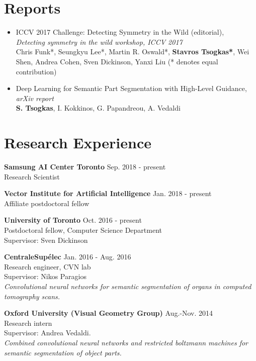 \documentclass[margin]{res}
\begin{document}
\begin{resume}
\section{Reports}
	\begin{itemize}
		\item ICCV 2017 Challenge: Detecting Symmetry in the Wild (editorial), \\
		\emph{Detecting symmetry in the wild workshop, ICCV 2017}\\
		Chris Funk*, Seungkyu Lee*, Martin R. Oswald*, \textbf{Stavros Tsogkas*}, 
		Wei Shen, Andrea Cohen, Sven Dickinson, Yanxi Liu 
		(* denotes equal contribution)
		\item  Deep Learning for Semantic Part Segmentation with High-Level Guidance, \emph{arXiv report}\\
		\textbf{S. Tsogkas}, I. Kokkinos, G. Papandreou, A. Vedaldi 
  \end{itemize}

\section{Research Experience} 
\textbf{Samsung AI Center Toronto} \hfill Sep. 2018 - present\\
Research Scientist 

\textbf{Vector Institute for Artificial Intelligence} \hfill Jan. 2018 - present\\
Affiliate postdoctoral fellow

\textbf{University of Toronto} \hfill Oct. 2016 - present\\
Postdoctoral fellow, Computer Science Department\\
Supervisor: Sven Dickinson

\textbf{CentraleSup\'elec} \hfill Jan. 2016 - Aug. 2016\\
Research engineer, CVN lab \\
Supervisor: Nikos Paragios \\
\emph{Convolutional neural networks for semantic 
	segmentation of organs in computed tomography scans.
}

\textbf{Oxford University (Visual Geometry Group)} \hfill Aug.-Nov. 2014\\
Research intern \\
Supervisor: Andrea Vedaldi. \\
\emph{Combined convolutional neural networks 
	and restricted boltzmann machines for semantic segmentation 
	of object parts.
}



\end{resume}
\end{document}
